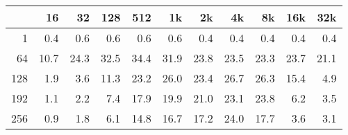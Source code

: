 \begin{tabular}{r | r r r r r r r r r r}
 	 &16	 &32	 &128	 &512	 &1k	 &2k	 &4k	 &8k	 &16k	 &32k	\\ \hline
1	& 0.4	& 0.6	& 0.6	& 0.6	& 0.6	& 0.4	& 0.4	& 0.4	& 0.4	& 0.4	\\
64	& 10.7	& 24.3	& 32.5	& 34.4	& 31.9	& 23.8	& 23.5	& 23.3	& 23.7	& 21.1	\\
128	& 1.9	& 3.6	& 11.3	& 23.2	& 26.0	& 23.4	& 26.7	& 26.3	& 15.4	& 4.9	\\
192	& 1.1	& 2.2	& 7.4	& 17.9	& 19.9	& 21.0	& 23.1	& 23.8	& 6.2	& 3.5	\\
256	& 0.9	& 1.8	& 6.1	& 14.8	& 16.7	& 17.2	& 24.0	& 17.7	& 3.6	& 3.1	\\
\end{tabular}
